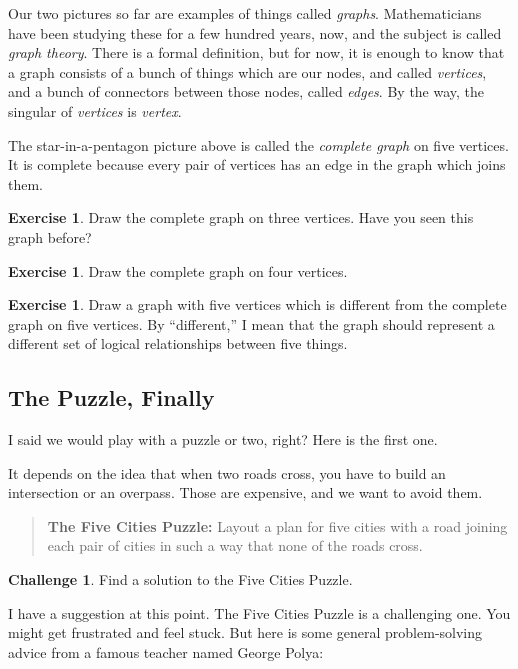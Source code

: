 \documentclass[12pt,letterpaper]{article}
\theoremstyle{definition}
\newtheorem{exercise}[question]{Exercise}
\newtheorem*{challenge}{Challenge}
\begin{document}
Our two pictures so far are examples of things called \emph{graphs}. Mathematicians have been studying these
for a few hundred years, now, and the subject is called \emph{graph theory}. There is a formal definition, but for 
now, it is enough to know that a graph consists of a bunch of things which are our nodes, and called 
\emph{vertices}, and a bunch of connectors between those nodes, called \emph{edges}.  By the way, the singular of \emph{vertices} is \emph{vertex}. 

The star-in-a-pentagon picture above is called the \emph{complete graph} on five vertices. It is complete because every pair of vertices has an edge in the graph which joins them.

\begin{exercise}
Draw the complete graph on three vertices. Have you seen this graph before?
\end{exercise}

\begin{exercise}
Draw the complete graph on four vertices.
\end{exercise}

\begin{exercise}
Draw a graph with five vertices which is different from the complete graph on five vertices. By ``different,'' I mean that the graph should represent a different set of logical relationships between five things.
\end{exercise}

\subsection*{The Puzzle, Finally}

I said we would play with a puzzle or two, right? Here is the first one.

It depends on the idea that when two roads cross, you have to build an intersection or an overpass. Those are expensive, and we want to avoid them.

\begin{quotation}\textbf{The Five Cities Puzzle:} Layout a plan for five cities with a road joining each pair of cities in such a way that none of the roads cross.
\end{quotation}

\begin{challenge}
Find a solution to the Five Cities Puzzle.
\end{challenge}

I have a suggestion at this point. The Five Cities Puzzle is a challenging one. You might get frustrated and feel stuck.
But here is some general problem-solving advice from a famous teacher named George Polya:
\end{document}
